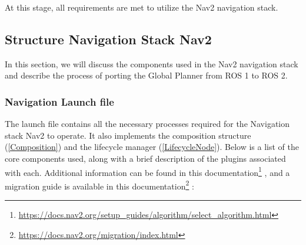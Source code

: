 At this stage, all requirements are met to utilize the Nav2 navigation stack.
\subsection{Structure Navigation Stack Nav2}
In this section, we will discuss the components used in the Nav2 navigation stack and describe the process of porting the Global Planner from ROS 1 to ROS 2.
\subsubsection{Navigation Launch file}
The launch file contains all the necessary processes required for the  Navigation stack Nav2 to operate. It also implements the composition structure (\ref{Composition}) and the lifecycle manager (\ref{LifecycleNode}).
Below is a list of the core components used, along with a brief description of the plugins associated with each.
Additional information can be found in this documentation\footnote{\href{https://docs.nav2.org/setup_guides/algorithm/select_algorithm.html}{https://docs.nav2.org/setup\_guides/algorithm/select\_algorithm.html}} , and a migration guide is available in this documentation\footnote{\href{https://docs.nav2.org/migration/index.html}{https://docs.nav2.org/migration/index.html}} :
